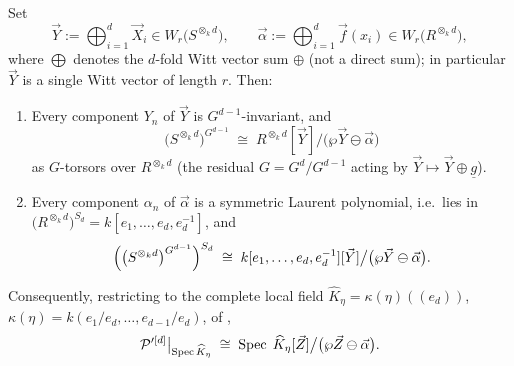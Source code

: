 \begin{prop}\label{prop:witt_cover_identification:reorg}
    Set
    \[
    \vec Y := \bigoplus_{i=1}^{d} \vec X_i \in W_r\bigl(S^{\otimes_k d}\bigr),
    \qquad
    \vec \alpha := \bigoplus_{i=1}^{d} \vec f(x_i) \in W_r\bigl(R^{\otimes_k d}\bigr),
    \]
    where $\bigoplus$ denotes the $d$-fold Witt vector sum $\oplus$ (not a direct
    sum); in particular $\vec Y$ is a single Witt vector of length $r$. Then:
    \begin{enumerate}
        \item \label{item:witt_cover_invariance:reorg} Every component $Y_n$ of $\vec Y$ is
        $G^{d-1}$-invariant, and
        \[
        \bigl(S^{\otimes_k d}\bigr)^{G^{d-1}}
        \;\cong\;
        R^{\otimes_k d}[\vec Y]\big/\bigl(\wp \vec Y \ominus \vec \alpha\bigr)
        \]
        as $G$-torsors over $R^{\otimes_k d}$ (the residual $G = G^d/G^{d-1}$ acting
        by $\vec Y \mapsto \vec Y \oplus \underline g$).
        \item \label{item:witt_cover_symmetry:reorg} Every component $\alpha_n$ of
        $\vec \alpha$ is a symmetric Laurent polynomial, i.e.\ lies in
        $\bigl(R^{\otimes_k d}\bigr)^{S_d} = k[e_1, \dots, e_d, e_d^{-1}]$, and
        \[
        \Bigl(\bigl(S^{\otimes_k d}\bigr)^{G^{d-1}}\Bigr)^{S_d}
        \;\cong\;
        k[e_1, \dots, e_d, e_d^{-1}][\vec Y]\big/\bigl(\wp \vec Y \ominus \vec \alpha\bigr).
        \]
    \end{enumerate}
    Consequently, restricting to the complete local field
    $\widehat K_\eta = \kappa(\eta)((e_d))$,
    $\kappa(\eta) = k(e_1/e_d, \dots, e_{d-1}/e_d)$, of
    ,
    \[
    \mathcal{P}'^{[d]}\big|_{\operatorname{Spec} \widehat K_\eta}
    \;\cong\;
    \operatorname{Spec}\; \widehat K_\eta[\vec Z]\big/\bigl(\wp \vec Z \ominus \vec \alpha\bigr).
    \]
\end{prop}


